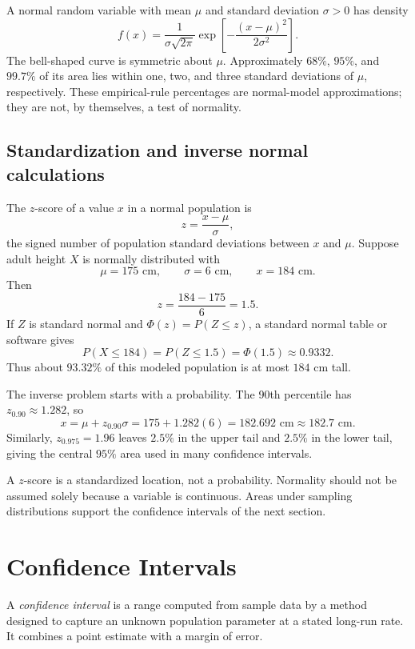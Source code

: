 \documentclass[11pt]{article}
\begin{document}
A normal random variable with mean $\mu$ and standard deviation $\sigma>0$
has density
\begin{equation}\label{eq:normal-density}
f(x)=\frac{1}{\sigma\sqrt{2\pi}}
\exp\!\left[-\frac{(x-\mu)^2}{2\sigma^2}\right].
\end{equation}
The bell-shaped curve is symmetric about $\mu$.  Approximately $68\%$,
$95\%$, and $99.7\%$ of its area lies within one, two, and three standard
deviations of $\mu$, respectively.  These empirical-rule percentages are
normal-model approximations; they are not, by themselves, a test of normality.

\subsection{Standardization and inverse normal calculations}
The $z$-score of a value $x$ in a normal population is
\begin{equation}\label{eq:zscore}
z=\frac{x-\mu}{\sigma},
\end{equation}
the signed number of population standard deviations between $x$ and $\mu$.
Suppose adult height $X$ is normally distributed with
\[
\mu=175\text{ cm},\qquad \sigma=6\text{ cm},\qquad x=184\text{ cm}.
\]
Then
\[
z=\frac{184-175}{6}=1.5.
\]
If $Z$ is standard normal and $\Phi(z)=P(Z\le z)$, a standard normal table or
software gives
\[
P(X\le184)=P(Z\le1.5)=\Phi(1.5)\approx0.9332.
\]
Thus about $93.32\%$ of this modeled population is at most $184$ cm tall.

The inverse problem starts with a probability.  The 90th percentile has
$z_{0.90}\approx1.282$, so
\[
x=\mu+z_{0.90}\sigma=175+1.282(6)=182.692\text{ cm}\approx182.7\text{ cm}.
\]
Similarly, $z_{0.975}=1.96$ leaves $2.5\%$ in the upper tail and $2.5\%$ in
the lower tail, giving the central $95\%$ area used in many confidence
intervals.

\begin{keybox}
A $z$-score is a standardized location, not a probability.  Normality should
not be assumed solely because a variable is continuous.  Areas under sampling
distributions support the confidence intervals of the next section.
\end{keybox}

\section{Confidence Intervals}\label{sec:ci}
A \emph{confidence interval} is a range computed from sample data by a method
designed to capture an unknown population parameter at a stated long-run
rate.  It combines a point estimate with a margin of error.
\end{document}

